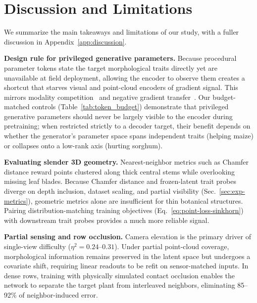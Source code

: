 \documentclass[10pt,twocolumn,letterpaper]{article}
\begin{document}
\section{Discussion and Limitations}
\label{sec:discussion}

We summarize the main takeaways and limitations of our study, with a fuller discussion in Appendix~\ref{app:discussion}.

\noindent\textbf{Design rule for privileged generative parameters.}
Because procedural parameter tokens state the target morphological traits directly yet are unavailable at field deployment, allowing the encoder to observe them creates a shortcut that starves visual and point-cloud encoders of gradient signal. This mirrors modality competition~\citep{peng2022ogm} and negative gradient transfer~\citep{yu2020pcgrad}. Our budget-matched controls (Table~\ref{tab:token_budget}) demonstrate that privileged generative parameters should never be largely visible to the encoder during pretraining; when restricted strictly to a decoder target, their benefit depends on whether the generator's parameter space spans independent traits (helping maize) or collapses onto a low-rank axis (hurting sorghum).

\noindent\textbf{Evaluating slender 3D geometry.}
Nearest-neighbor metrics such as Chamfer distance reward points clustered along thick central stems while overlooking missing leaf blades. Because Chamfer distance and frozen-latent trait probes diverge on depth inclusion, dataset scaling, and partial visibility (Sec.~\ref{sec:exp-metrics}), geometric metrics alone are insufficient for thin botanical structures. Pairing distribution-matching training objectives (Eq.~\ref{eq:point-loss-sinkhorn}) with downstream trait probes provides a much more reliable signal.

\noindent\textbf{Partial sensing and row occlusion.}
Camera elevation is the primary driver of single-view difficulty ($\eta^2 = 0.24\text{--}0.31$). Under partial point-cloud coverage, morphological information remains preserved in the latent space but undergoes a covariate shift, requiring linear readouts to be refit on sensor-matched inputs. In dense rows, training with physically simulated contact occlusion enables the network to separate the target plant from interleaved neighbors, eliminating 85--92\% of neighbor-induced error.
\end{document}
